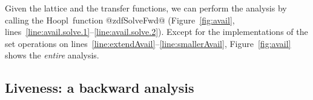 \documentclass[blockstyle,preprint,natbib,nocopyrightspace]{sigplanconf}
\newcommand\ourlib{Hoopl}  %
\newcommand\linerangeref[2]{\mbox{lines~\ref{line:#1}--\ref{line:#2}}}
\newcommand\delendum[1]{\relax\ifvmode\else\unskip\fi\relax}
\newcommand\figref[1]{Figure~\ref{fig:#1}}
\begin{document}

Given the lattice and the transfer functions,
we can perform the analysis by calling
the \ourlib\ function @zdfSolveFwd@ (\figref{avail},
\linerangeref{avail.solve.1}{avail.solve.2}). 
\delendum{But this is really a lie. We actually call the transformation 
function!  I'm not quite sure how to fix this pedagogical point.
NR: It's true that we don't actually have a use for the results of an
independent available-variables analysis, other than to drive the
transformation in the next section.  But just because we have no use
for the results at present does not  make the example analysis
incorrect or invalid, and I think the pedagogy is sound.
}
Except for the implementations of the set operations on
\linerangeref{extendAvail}{smallerAvail}, 
\figref{avail} shows the \emph{entire} analysis.

\subsection{Liveness: a backward analysis} 
\end{document}
